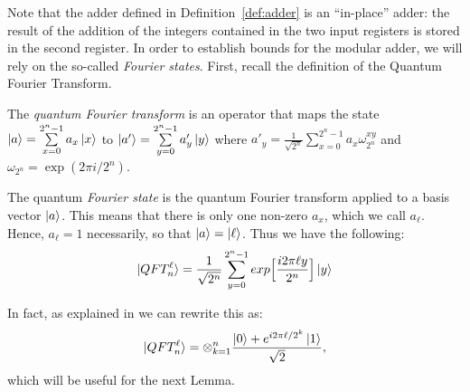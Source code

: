 \documentclass[12pt]{dalthesis}
\begin{document}
Note that the adder defined in Definition~\ref{def:adder} is an
``in-place'' adder: the result of the addition of the integers
contained in the two input registers is stored in the second register. In order to establish bounds for the modular adder, we will rely on the
so-called \emph{Fourier states}. First, recall the definition of the Quantum Fourier Transform.

\begin{definition}
  The \emph{quantum Fourier transform} is an operator that maps the state $\ket{a} = \sum\limits_{x=0}^{2^n-1} a_x \ket{x}$ to $\ket{a'} = \sum\limits_{y=0}^{2^n-1} a'_y \ket{y}$ where $a'_y = \frac{1}{\sqrt{2^n}}\sum\limits_{x=0}^{2^n-1}a_x\omega_{2^n}^{xy}$ and $\omega_{2^n} = \exp (2\pi i/2^n)$.
\end{definition}

\begin{definition}
The quantum \emph{Fourier state} is the quantum Fourier transform applied to a basis vector $\ket{a}$. This means that there is only one non-zero $a_x$, which we call $a_\ell$. Hence, $a_\ell = 1$ necessarily,  so that $\ket{a} = \ket{\ell}$. Thus we have the following:
\begin{equation}
\label{QFTdef}
\ket{QFT_n^\ell} = \frac{1}{\sqrt{2^n}} \sum\limits_{y=0}^{2^n-1} exp \Big[ \frac{i2 \pi \ell y}{2^n} \Big] \ket{y}
\end{equation}
\end{definition}
In fact, as explained in \cite{nielsen00} we can rewrite this as: 
\[
\ket{QFT_n^\ell} = \otimes_{k=1}^n \frac{\ket{0} + e^{i2\pi \ell/2^k} \ket{1}}{\sqrt{2}},\] which will be useful for the next Lemma.
\end{document}
